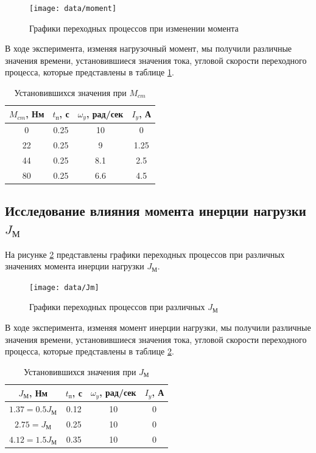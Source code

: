 \documentclass[a4paper, 12pt]{article}
\begin{document}
\begin{figure}[h!]
	\centering
	\texttt{[image: data/moment]}
	\caption{Графики переходных процессов при изменении момента}
	\label{moment}
\end{figure}  
В ходе эксперимента, изменяя нагрузочный момент, мы получили различные значения времени, установившиеся значения тока, угловой скорости переходного процесса, которые представлены в таблице \ref{tab:moment}.

\begin{table}[h!]
	\centering
	\begin{threeparttable}
		\caption{Установившихся значения при $M_{cm}$}
		\begin{tabular}{|c|c|c|c|}
			\hline
			$M_{cm}$, Нм	&	$t_\text{п}$, с	&	$\omega_y$, рад/сек	&	$I_y$, А\\
			\hline
			0		&	0.25			&	10			&	0\\
			\hline
			22		&	0.25			&	9			&	1.25\\
			\hline
			44		&	0.25			&	8.1			&	2.5\\
			\hline
			80		&	0.25			&	6.6			&	4.5\\
			\hline
			
		\end{tabular}
		\label{tab:moment}
	\end{threeparttable}
\end{table}

\newpage
\begin{center}
\section{Исследование влияния момента инерции нагрузки $J_\text{М}$}
\end{center}
На рисунке \ref{Jm} представлены графики переходных процессов при различных значениях момента инерции нагрузки $J_\text{М}$.

\begin{figure}[h!]
	\centering
	\texttt{[image: data/Jm]}
	\caption{Графики переходных процессов при различных $J_\text{М}$}
	\label{Jm}
\end{figure}

В ходе эксперимента, изменяя момент инерции нагрузки, мы получили различные значения времени, установившиеся значения тока, угловой скорости переходного процесса, которые представлены в таблице \ref{tab:Jm}.

\begin{table}[h!]
	\centering
	\begin{threeparttable}
		\caption{Установившихся значения при $J_\text{М}$}
		\begin{tabular}{|c|c|c|c|}
			\hline
			$J_\text{М}$, Нм	&	$t_\text{п}$, с	&	$\omega_y$, рад/сек	&	$I_y$, А\\
			\hline
			$1.37=0.5J_\text{М}$		&	0.12	&	10		&	0\\
			\hline
			$2.75=J_\text{М}$		&	0.25	&	10		&	0\\
			\hline
			$4.12=1.5J_\text{М}$		&	0.35		&	10		&	0\\
			\hline			
		\end{tabular}
		\label{tab:Jm}
	\end{threeparttable}
\end{table}
\end{document}
